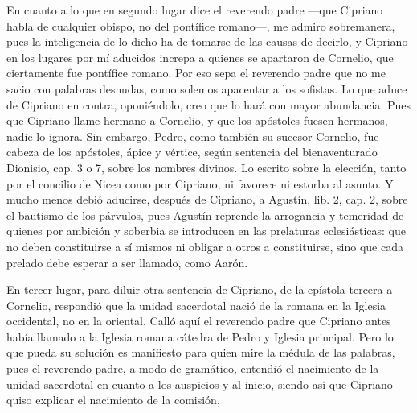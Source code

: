 En cuanto a lo que en segundo lugar dice el reverendo padre —que Cipriano habla de cualquier obispo, no del pontífice romano—, me admiro sobremanera, pues la inteligencia de lo dicho ha de tomarse de las causas de decirlo, y Cipriano en los lugares por mí aducidos increpa a quienes se apartaron de Cornelio, que ciertamente fue pontífice romano. Por eso sepa el reverendo padre que no me sacio con palabras desnudas, como solemos apacentar a los sofistas. Lo que aduce de Cipriano en contra, oponiéndolo, creo que lo hará con mayor abundancia. Pues que Cipriano llame hermano a Cornelio, y que los apóstoles fuesen hermanos, nadie lo ignora. Sin embargo, Pedro, como también su sucesor Cornelio, fue cabeza de los apóstoles, ápice y vértice, según sentencia del bienaventurado Dionisio, cap. 3 o 7, sobre los nombres divinos. Lo escrito sobre la elección, tanto por el concilio de Nicea como por Cipriano, ni favorece ni estorba al asunto. Y mucho menos debió aducirse, después de Cipriano, a Agustín, lib. 2, cap. 2, sobre el bautismo de los párvulos, pues Agustín reprende la arrogancia y temeridad de quienes por ambición y soberbia se introducen en las prelaturas eclesiásticas: que no deben constituirse a sí mismos ni obligar a otros a constituirse, sino que cada prelado debe esperar a ser llamado, como Aarón.

En tercer lugar, para diluir otra sentencia de Cipriano, de la epístola tercera a Cornelio, respondió que la unidad sacerdotal nació de la romana en la Iglesia occidental, no en la oriental. Calló aquí el reverendo padre que Cipriano antes había llamado a la Iglesia romana cátedra de Pedro y Iglesia principal. Pero lo que pueda su solución es manifiesto para quien mire la médula de las palabras, pues el reverendo padre, a modo de gramático, entendió el nacimiento de la unidad sacerdotal en cuanto a los auspicios y al inicio, siendo así que Cipriano quiso explicar el nacimiento de la comisión,

